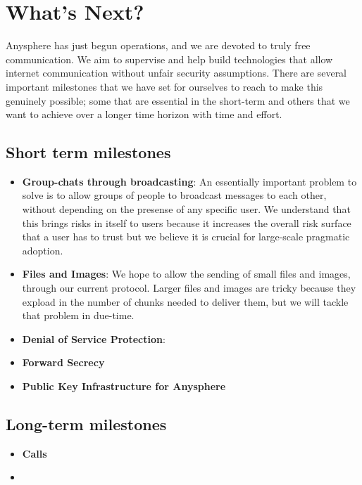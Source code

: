 \section{What's Next?}

Anysphere has just begun operations, and we are devoted to truly free communication. 
We aim to supervise and help build technologies that allow internet communication without unfair security assumptions.
There are several important milestones that we have set for ourselves to reach to make this genuinely possible; some that are essential in the short-term and others that we want to achieve over a longer time horizon with time and effort.

\subsection{Short term milestones}
\begin{itemize}
  \item \textbf{Group-chats through broadcasting}: An essentially important problem to solve is to allow groups of people to broadcast messages to each other, without depending on the presense of any specific user. We understand that this brings risks in itself to users because it increases the overall risk surface that a user has to trust but we believe it is crucial for large-scale pragmatic adoption.

  \item \textbf{Files and Images}: We hope to allow the sending of small files and images, through our current protocol. Larger files and images are tricky because they expload in the number of chunks needed to deliver them, but we will tackle that problem in due-time.

  \item \textbf{Denial of Service Protection}:

  \item \textbf{Forward Secrecy}

  \item \textbf{Public Key Infrastructure for Anysphere}
\end{itemize}

\subsection{Long-term milestones}
\begin{itemize}
  \item \textbf{Calls}

  \item \textbf{}
\end{itemize}
